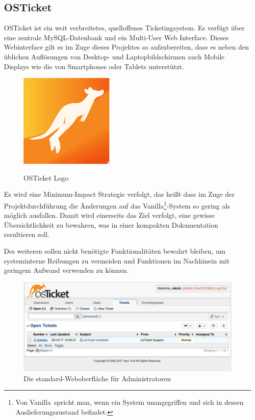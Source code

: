 	\subsection{OSTicket}
	OSTicket ist ein weit verbreitetes, quelloffenes Ticketingsystem. Es verfügt über eine zentrale MySQL-Datenbank und ein Multi-User Web Interface. Dieses Webinterface gilt es im Zuge dieses Projektes so aufzubereiten, dass es neben den üblichen Auflösungen von Desktop- und Laptopbildschirmen auch Mobile Displays wie die von Smartphones oder Tablets unterstützt.
		
	\begin{figure}
		\vspace{-2cm}
		\begin{center}
		\caption{OSTicket Logo}
		\includegraphics[scale=.7]{figures/icon_osticket.png}
		\label{OSTicket Logo}
		\end{center}
	\end{figure}

	Es wird eine Minimum-Impact Strategie verfolgt, das heißt dass im Zuge der Projektdurchführung die Änderungen auf das Vanilla\footnote{Von \glqq Vanilla\grqq\ spricht man, wenn ein System unangegriffen und sich in dessen Auslieferungszustand befindet.}-System so gering als möglich ausfallen. Damit wird einerseits das Ziel verfolgt, eine gewisse Übersichtlichkeit zu bewahren, was in einer kompakten Dokumentation resultieren soll.
	
	Des weiteren sollen nicht benötigte Funktionalitäten bewahrt bleiben, um systeminterne Reibungen zu vermeiden und Funktionen im Nachhinein mit geringem Aufwand verwenden zu können.
	
	\begin{figure}[h]
		\centering
		\includegraphics[scale=0.62]{figures/osticket.png}
		\caption{Die standard-Weboberfläche für Administratoren}
		\label{OSTicket Admin WebGUI}
	\end{figure}

